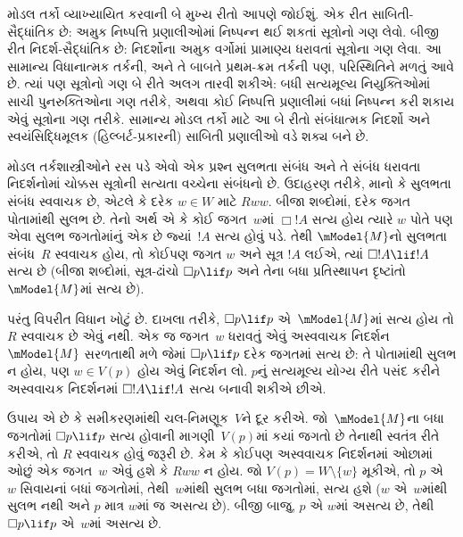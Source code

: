 મોડલ તર્કો વ્યાખ્યાયિત કરવાની
બે મુખ્ય રીતો આપણે જોઈશું.
એક રીત સાબિતી-સૈદ્ધાંતિક
છે: અમુક નિષ્પત્તિ
પ્રણાલીઓમાં નિષ્પન્ન થઈ
શકતાં સૂત્રોનો ગણ
લેવો. બીજી રીત
નિદર્શ-સૈદ્ધાંતિક છે:
નિદર્શોના અમુક વર્ગોમાં
પ્રામાણ્ય ધરાવતાં
સૂત્રોના ગણ લેવા.
આ સામાન્ય વિધાનાત્મક
તર્કની, અને તે બાબતે
પ્રથમ-ક્રમ તર્કની પણ,
પરિસ્થિતિને મળતું આવે
છે. ત્યાં પણ
સૂત્રોનો ગણ
બે રીતે અલગ તારવી
શકીએ: બધી સત્યમૂલ્ય
નિયુક્તિઓમાં સાચી
પુનરુક્તિઓના ગણ તરીકે,
અથવા કોઈ નિષ્પત્તિ
પ્રણાલીમાં બધાં
નિષ્પન્ન કરી શકાય એવું
સૂત્રોના ગણ
તરીકે. સામાન્ય
મોડલ તર્કો માટે
આ બે રીતો
સંબંધાત્મક નિદર્શો
અને સ્વયંસિદ્ધિમૂલક
(હિલ્બર્ટ-પ્રકારની)
સાબિતી પ્રણાલીઓ
વડે શક્ય બને છે.
\endgroup
\endgroup


\begingroup
\makeatletter{}\makeatother

\label{guunit:OLP-0419}


\begingroup
\makeatletter{}\makeatother


\label{guunit:OLP-0420}


મોડલ તર્કશાસ્ત્રીઓને રસ પડે એવો એક પ્રશ્ન સુલભતા
સંબંધ અને તે સંબંધ ધરાવતા નિદર્શનોમાં ચોક્કસ
સૂત્રોની સત્યતા વચ્ચેના સંબંધનો છે. ઉદાહરણ
તરીકે, માનો કે સુલભતા સંબંધ સ્વવાચક છે, એટલે કે
દરેક $w
\in W$ માટે $Rww$. બીજા શબ્દોમાં, દરેક જગત
પોતામાંથી સુલભ છે. તેનો અર્થ એ કે કોઈ જગત~$w$માં
$\Box !A$ સત્ય હોય ત્યારે $w$ પોતે પણ એવા સુલભ
જગતોમાંનું એક છે જ્યાં~$!A$ સત્ય હોવું પડે. તેથી
$\mModel{M}$નો સુલભતા સંબંધ~$R$ સ્વવાચક હોય, તો
કોઈપણ જગત $w$ અને સૂત્ર $!A$ લઈએ, ત્યાં $\Box !A
\lif !A$ સત્ય છે (બીજા શબ્દોમાં, સૂત્ર-ઢાંચો $\Box p \lif
p$ અને તેના બધા પ્રતિસ્થાપન દૃષ્ટાંતો~$\mModel{M}$માં
સત્ય છે).

પરંતુ વિપરીત વિધાન ખોટું છે. દાખલા તરીકે,
$\Box p \lif p$ એ~$\mModel{M}$માં સત્ય હોય તો $R$
સ્વવાચક છે એવું નથી. એક જ જગત~$w$ ધરાવતું એવું
અસ્વવાચક નિદર્શન~$\mModel{M}$ સરળતાથી મળે જેમાં
$\Box p \lif
p$ દરેક જગતમાં સત્ય છે: તે પોતામાંથી સુલભ
ન હોય, પણ $w \in V(p)$ હોય એવું નિદર્શન લો.
$p$નું સત્યમૂલ્ય યોગ્ય રીતે પસંદ કરીને અસ્વવાચક
નિદર્શનમાં $\Box !A \lif !A$ સત્ય બનાવી શકીએ છીએ.

ઉપાય એ છે કે સમીકરણમાંથી ચલ-નિમણૂક~$V$ને દૂર કરીએ.
જો~$\mModel{M}$ના બધા જગતોમાં $\Box p \lif p$ સત્ય
હોવાની માગણી~$V(p)$માં કયાં જગતો છે તેનાથી સ્વતંત્ર
રીતે કરીએ, તો $R$ સ્વવાચક હોવું જરૂરી છે. કેમ કે
કોઈપણ અસ્વવાચક નિદર્શનમાં ઓછામાં ઓછું એક જગત~$w$
એવું હશે કે $Rww$ ન હોય. જો $V(p) =
W \setminus \{w\}$ મૂકીએ, તો $p$ એ~$w$ સિવાયનાં
બધાં જગતોમાં, તેથી~$w$માંથી સુલભ બધા જગતોમાં,
સત્ય હશે ($w$ એ~$w$માંથી સુલભ નથી અને $p$ માત્ર
$w$માં જ અસત્ય છે). બીજી બાજુ, $p$ એ $w$માં
અસત્ય છે, તેથી $\Box
p \lif p$ એ~$w$માં અસત્ય છે.

